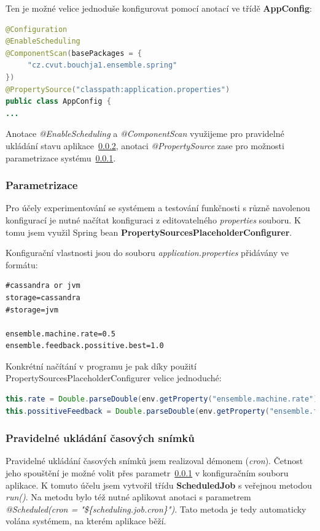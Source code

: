 \documentclass[thesis=M,czech]{FITthesis}[2014/05/07]
\begin{document}
Ten je možné velice jednoduše konfigurovat pomocí anotací ve třídě \textbf{AppConfig}:

\begin{lstlisting}[language=java]
@Configuration
@EnableScheduling
@ComponentScan(basePackages = {
     "cz.cvut.bouchja1.ensemble.spring"
})
@PropertySource("classpath:application.properties")
public class AppConfig {
...
\end{lstlisting}

Anotace \emph{@EnableScheduling} a \emph{@ComponentScan} využijeme pro pravidelné ukládání stavu aplikace~\ref{task}, anotaci \emph{@PropertySource} zase pro možnosti parametrizace systému~\ref{param}.

\subsubsection{Parametrizace}
\label{param}
Pro účely experimentování se systémem a testování funkčnosti s různě navolenou konfigurací je nutné načítat konfiguraci z editovatelného \emph{properties} souboru. K tomu jsem využil Spring bean \textbf{PropertySourcesPlaceholderConfigurer}.

Konfigurační vlastnosti jsou do souboru \emph{application.properties} přidávány ve formátu:

\begin{lstlisting}
#cassandra or jvm
storage=cassandra
#storage=jvm
   
ensemble.machine.rate=0.5
ensemble.feedback.possitive.best=1.0
\end{lstlisting}

Konkrétní načítání v programu je pak díky použití PropertySourcesPlaceholderConfigurer velice jednoduché:

\begin{lstlisting}[language=java]
this.rate = Double.parseDouble(env.getProperty("ensemble.machine.rate"));
this.possitiveFeedback = Double.parseDouble(env.getProperty("ensemble.feedback.possitive.best"));
\end{lstlisting}

\subsubsection{Pravidelné ukládání časových snímků}
\label{task}
Pravidelné ukládání časových snímků jsem realizoval démonem (\emph{cron}). Četnost jeho spouštění je možné volit přes parametr~\ref{param} v konfiguračním souboru aplikace. K tomuto účelu jsem vytvořil třídu \textbf{ScheduledJob} s veřejnou metodou \emph{run()}. Na metodu bylo též nutné aplikovat anotaci s parametrem \emph{@Scheduled(cron = "\$\{scheduling.job.cron\}")}. Tato metoda je tedy automaticky volána systémem, na kterém aplikace běží. 
\end{document}
